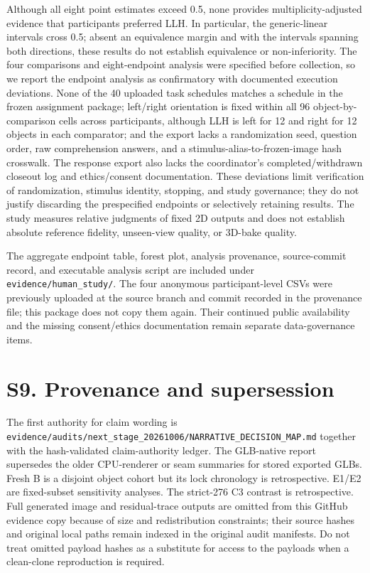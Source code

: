 \documentclass[10pt]{article}
\begin{document}
Although all eight point estimates exceed 0.5, none provides multiplicity-adjusted evidence that participants preferred LLH. In particular, the generic-linear intervals cross 0.5; absent an equivalence margin and with the intervals spanning both directions, these results do not establish equivalence or non-inferiority. The four comparisons and eight-endpoint analysis were specified before collection, so we report the endpoint analysis as confirmatory with documented execution deviations. None of the 40 uploaded task schedules matches a schedule in the frozen assignment package; left/right orientation is fixed within all 96 object-by-comparison cells across participants, although LLH is left for 12 and right for 12 objects in each comparator; and the export lacks a randomization seed, question order, raw comprehension answers, and a stimulus-alias-to-frozen-image hash crosswalk. The response export also lacks the coordinator's completed/withdrawn closeout log and ethics/consent documentation. These deviations limit verification of randomization, stimulus identity, stopping, and study governance; they do not justify discarding the prespecified endpoints or selectively retaining results. The study measures relative judgments of fixed 2D outputs and does not establish absolute reference fidelity, unseen-view quality, or 3D-bake quality.

The aggregate endpoint table, forest plot, analysis provenance, source-commit record, and executable analysis script are included under \texttt{evidence/human\_study/}. The four anonymous participant-level CSVs were previously uploaded at the source branch and commit recorded in the provenance file; this package does not copy them again. Their continued public availability and the missing consent/ethics documentation remain separate data-governance items.

\section{S9. Provenance and supersession}

The first authority for claim wording is \texttt{evidence/audits/next\_stage\_20261006/NARRATIVE\_DECISION\_MAP.md} together with the hash-validated claim-authority ledger. The GLB-native report supersedes the older CPU-renderer or seam summaries for stored exported GLBs. Fresh B is a disjoint object cohort but its lock chronology is retrospective. E1/E2 are fixed-subset sensitivity analyses. The strict-276 C3 contrast is retrospective. Full generated image and residual-trace outputs are omitted from this GitHub evidence copy because of size and redistribution constraints; their source hashes and original local paths remain indexed in the original audit manifests. Do not treat omitted payload hashes as a substitute for access to the payloads when a clean-clone reproduction is required.
\end{document}

